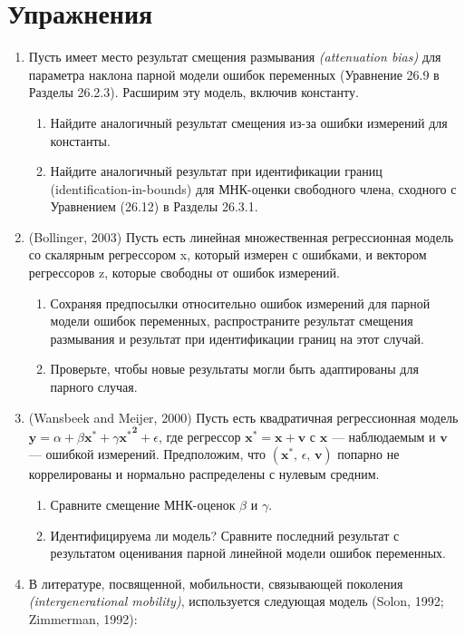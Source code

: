 \section*{Упражнения} 
\begin{enumerate}
\item Пусть имеет место результат смещения размывания \emph{(attenuation bias)} для параметра наклона парной модели ошибок переменных (Уравнение 26.9 в Разделы 26.2.3). Расширим эту модель, включив константу.
\begin{enumerate}
\item Найдите аналогичный результат  смещения из-за ошибки измерений для константы.
\item	Найдите аналогичный результат при идентификации границ (identification-in-bounds) для МНК-оценки свободного члена, сходного с Уравнением (26.12) в Разделы 26.3.1.
\end{enumerate}
\item (Bollinger, 2003) Пусть есть линейная множественная регрессионная модель со скалярным регрессором x, который измерен с ошибками, и вектором регрессоров z, которые свободны от ошибок измерений.
\begin{enumerate}
\item Сохраняя предпосылки относительно ошибок измерений для парной модели ошибок переменных, распространите результат смещения размывания и результат при идентификации границ на этот случай.
\item Проверьте, чтобы новые результаты могли быть адаптированы для парного случая.
\end{enumerate}
\item (Wansbeek and Meijer, 2000) Пусть есть квадратичная регрессионная модель $\mathbf{y}=\alpha + \beta\mathbf{x^*}+\gamma\mathbf{{x^*}^2}+\epsilon$, где регрессор $\mathbf{x^*}=\mathbf{x}+\mathbf{v}$ с $\mathbf{x}$ --– наблюдаемым и $\mathbf{v}$ --– ошибкой измерений. Предположим, что $(\mathbf
x^*, \, \epsilon, \, \mathbf{v})$ попарно не коррелированы и нормально распределены с нулевым средним.
\begin{enumerate}
\item	Сравните смещение МНК-оценок $\beta$ и $\gamma$.
\item	Идентифицируема ли модель? Сравните последний результат с результатом оценивания парной линейной модели ошибок переменных.
\end{enumerate}
\item В литературе, посвященной, мобильности, связывающей поколения \emph{(intergenerational mobility)}, используется следующая модель (Solon, 1992; Zimmerman, 1992):

\end{enumerate}
